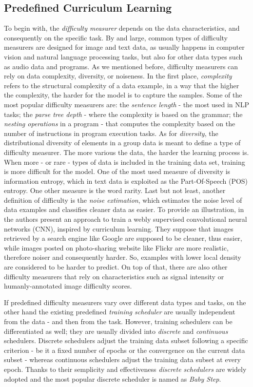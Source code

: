 \subsection{Predefined Curriculum Learning}
To begin with, the \textit{difficulty measurer} depends on the data characteristics, and consequently
on the specific task. 
By and large, common types of difficulty measurers are designed for image and text data, as usually happens in computer vision and natural language processing tasks, 
but also for other data types such as audio data and programs. 
As we mentioned before, difficulty measurers can rely on data complexity, diversity, or noiseness.
In the first place, \textit{complexity} refers to the structural complexity of a data example, in a way that the higher the complexity, 
the harder for the model is to capture the samples. 
Some of the most popular difficulty measurers are: the \textit{sentence length} - the most used in NLP tasks;
the \textit{parse tree depth} - where the complexity is based on the grammar; the \textit{nesting operations} in a program - that computes the complexity based on the number of instructions in
program execution tasks. 
As for \textit{diversity}, the distributional diversity of elements in a group data is meant to define a type of difficulty measurer.
The more various the data, the harder the learning process is.
When more - or rare - types of data is included in the training data set, training is more difficult for the model. 
One of the most used measure of diversity is information entropy, which in text data is exploited as the Part-Of-Speech (POS) entropy. One other measure is the word rarity.
Last but not least, another definition of difficulty is the \textit{noise extimation}, which estimates
the noise level of data examples and classifies cleaner data as easier. To provide an illustration, in \cite{chen2015webly}
the authors present an approach to train a webly supervised convolutional neural networks (CNN), inspired by curriculum learning.
They suppose that images retrieved by a search engine like Google are supposed to be cleaner, thus easier, while images
posted on photo-sharing website like Flickr are more realistic, therefore noiser and consequently harder. 
So, examples with lower local density are considered to be harder to predict. 
On top of that, there are also other difficulty measurers that rely on 
characteristics such as signal intensity or humanly-annotated image difficulty scores.

If predefined difficulty measurers vary over different data types and tasks, on the other hand
the existing predefined \textit{training scheduler} are usually independent from the data - and then from the task.
However, training schedulers can be differentiated as well; they are usually divided into \textit{discrete} and \textit{continuous} schedulers.
Discrete schedulers adjust the training data subset following a specific criterion - 
be it a fixed number of epochs or the convergence on the current data subset - whereas continuous schedulers adjust 
the training data subset at every epoch.
Thanks to their semplicity and effectiveness \textit{discrete schedulers} are widely adopted and the most popular
discrete scheduler is named as \textit{Baby Step}. 

